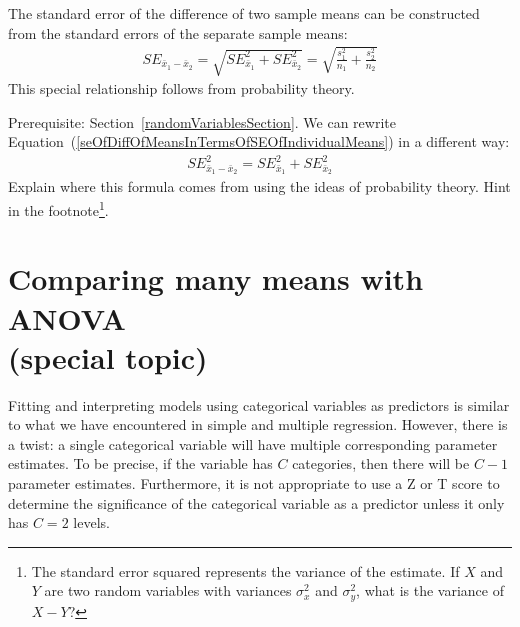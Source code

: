 The standard error of the difference of two sample means can be constructed from the standard errors of the separate sample means:
\begin{eqnarray}
SE_{\bar{x}_{1} - \bar{x}_{2}}
	= \sqrt{SE_{\bar{x}_1}^2 + SE_{\bar{x}_2}^2}
	= \sqrt{\frac{s_1^2}{{n_1}} + \frac{s_2^2}{{n_2}}}
\label{seOfDiffOfMeansInTermsOfSEOfIndividualMeans}
\end{eqnarray}
This special relationship follows from probability theory.

\begin{exercise} Prerequisite: Section~\ref{randomVariablesSection}.
We can rewrite Equation~(\ref{seOfDiffOfMeansInTermsOfSEOfIndividualMeans}) in a different way:
\begin{eqnarray*}
SE_{\bar{x}_{1} - \bar{x}_{2}}^2 = SE_{\bar{x}_1}^2 + SE_{\bar{x}_2}^2
\end{eqnarray*}
Explain where this formula comes from using the ideas of probability theory. Hint in the footnote\footnote{The standard error squared represents the variance of the estimate. If $X$ and $Y$ are two random variables with variances $\sigma_x^2$ and $\sigma_y^2$, what is the variance of $X-Y$?}.
\end{exercise}


\section[Comparing many means with ANOVA (special topic)]{Comparing many means with ANOVA\\(special topic)}
\label{anovaAndRegrWithCategoricalVariables}

Fitting and interpreting models using categorical variables as predictors is similar to what we have encountered in simple and multiple regression. However, there is a twist: a single categorical variable will have multiple corresponding parameter estimates. To be precise, if the variable has $C$ categories, then there will be $C-1$ parameter estimates. Furthermore, it is not appropriate to use a Z or T score to determine the significance of the categorical variable as a predictor unless it only has $C=2$ levels.

